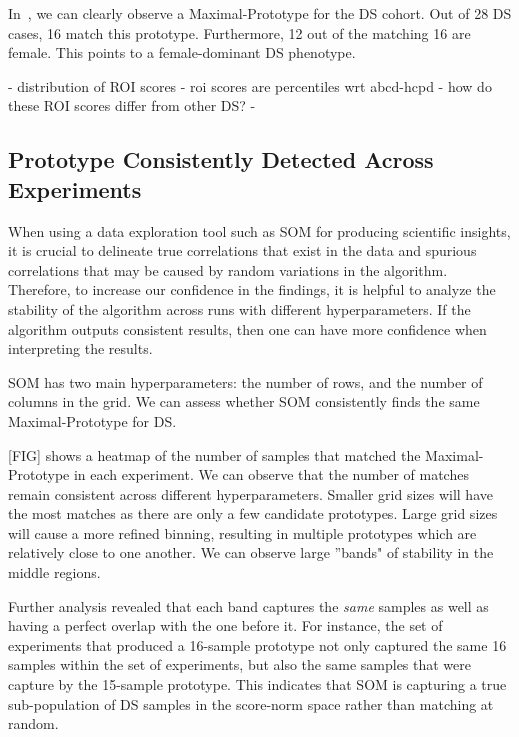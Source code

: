 In~, we can clearly observe a Maximal-Prototype for the DS cohort. Out of 28 DS cases, 16 match this prototype. Furthermore, 12 out of the matching 16 are female. This points to a female-dominant DS phenotype.

- distribution of ROI scores
 - roi scores are percentiles wrt abcd-hcpd
- how do these ROI scores differ from other DS?
- 


\subsection*{Prototype Consistently Detected Across Experiments}

When using a data exploration tool such as SOM for producing scientific insights, it is crucial to delineate true correlations that exist in the data and spurious correlations that may be caused by random variations in the algorithm. Therefore, to increase our confidence in the findings, it is helpful to analyze the stability of the algorithm across runs with different hyperparameters. If the algorithm outputs consistent results, then one can have more confidence when interpreting the results.

SOM has two main hyperparameters: the number of rows, and the number of columns in the grid. We can assess whether SOM consistently finds the same Maximal-Prototype for DS.

[FIG] shows a heatmap of the number of samples that matched the Maximal-Prototype in each experiment. We can observe that the number of matches remain consistent across different hyperparameters. Smaller grid sizes will have the most matches as there are only a few candidate prototypes. Large grid sizes will cause a more refined binning, resulting in multiple prototypes which are relatively close to one another. We can observe large ''bands" of stability in the middle regions.

Further analysis revealed that each band captures the \textit{same} samples as well as having a perfect overlap with the one before it. For instance, the set of experiments that produced a 16-sample prototype not only captured the same 16 samples within the set of experiments, but also the same samples that were capture by the 15-sample prototype. This indicates that SOM is capturing a true sub-population of DS samples in the score-norm space rather than matching at random.





